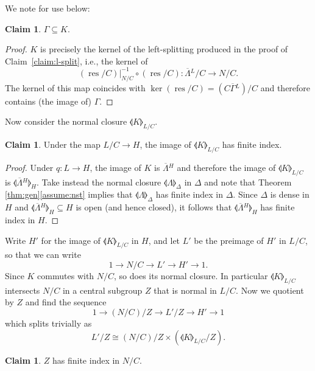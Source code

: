 \documentclass[11pt]{article}
\newcommand{\ie}{i.e.,\xspace}
\numberwithin{equation}{section}\providecommand{\llangle}{\langle\!\langle}\providecommand{\rrangle}{\rangle\!\rangle}\providecommand{\Asterisk}{\ast}
\newcommand{\oGL}{\ensuremath{\overline{\Gamma}{}^L}}
\newcommand{\oLL}{\ensuremath{\overline{\Lambda}{}^L}}
\newcommand{\oLH}{\ensuremath{\overline{\Lambda}{}^H}}
\DeclareMathOperator{\res}{res}
\theoremstyle{definition}
\newtheorem{claim}[thm]{Claim}
\begin{document}
We note for use below:
\begin{claim}\label{claim:Gamma-subset-K}
$\Gamma\subseteq K$.
\end{claim}
\begin{proof} $K$ is precisely the kernel of the left-splitting produced in the proof of Claim~\ref{claim:l-split}, \ie the kernel of
\[
(\res/C)|_{N/C}^{-1} \circ (\res/C): \oLL/C\longrightarrow N/C.
\]
The kernel of this map coincides with $\ker(\res/C)=(C\oGL)/C$ and therefore contains (the image of) $\Gamma$.\end{proof}
Now consider the normal closure $\llangle K\rrangle_{L/C}$.
\begin{claim} Under the map $L/C\to H$, the image of $\llangle K\rrangle_{L/C}$ has finite index.\end{claim}
\begin{proof} Under $q:L\to H$, the image of $K$ is $\oLH$ and therefore the image of $\llangle K\rrangle_{L/C}$ is $\llangle \oLH\rrangle_H$. Take instead the normal closure $\llangle\Lambda\rrangle_\Delta$ in $\Delta$ and note that Theorem \ref{thm:gen}\eqref{assume:nst} implies that $\llangle \Lambda\rrangle_\Delta$ has finite index in $\Delta$. Since $\Delta$ is dense in $H$ and $\llangle \oLH\rrangle_H\subseteq H$ is open (and hence closed), it follows that $\llangle \oLH\rrangle_H$ has finite index in $H$.\end{proof}
Write $H'$ for the image of $\llangle K\rrangle_{L/C}$ in $H$, and let $L'$ be the preimage of $H'$ in $L/C$, so that we can write
\begin{equation}\label{eq:ses-mod-c}
1\to N/C\to L'\to H'\to 1.
\end{equation}
Since $K$ commutes with $N/C$, so does its normal closure. In particular $\llangle K\rrangle_{L/C}$ intersects $N/C$ in a central subgroup $Z$ that is normal in $L/C$. Now we quotient by $Z$ and find the sequence
\begin{equation}\label{eq:ses-mod-cz}
1\to (N/C)/Z \to L'/Z \to H'\to 1
\end{equation}
which splits trivially as
\[
L'/Z\cong (N/C)/Z \times (\llangle K\rrangle_{L/C} / Z).
\]
\begin{claim}\label{claim:z-nc-fi}
$Z$ has finite index in $N/C$.
\end{claim}
\end{document}
